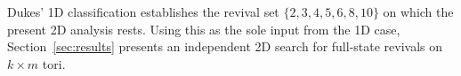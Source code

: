 Dukes' 1D classification establishes the revival set
$\{2,3,4,5,6,8,10\}$ on which the present 2D analysis rests. Using this
as the sole input from the 1D case, Section~\ref{sec:results} presents
an independent 2D search for full-state revivals on $k \times m$
tori.
